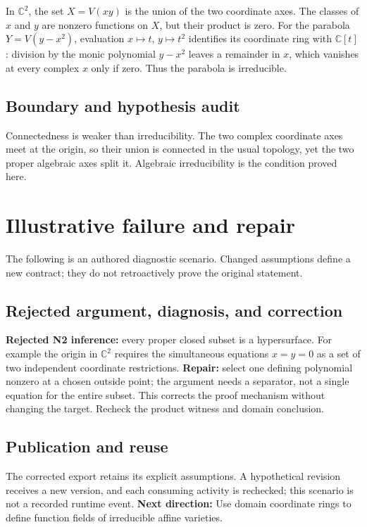 \documentclass[preprint,12pt,aps,pra,showkeys,amsmath,amssymb,superscriptaddress,floatfix]{revtex4-2}
\theoremstyle{definition}
\theoremstyle{remark}
\begin{document}
In \(\mathbb C^2\), the set \(X=V(xy)\) is the union of the two
coordinate axes. The classes of \(x\) and \(y\) are nonzero functions on
\(X\), but their product is zero. For the parabola \(Y=V(y-x^2)\),
evaluation \(x\mapsto t\), \(y\mapsto t^2\) identifies its coordinate
ring with \(\mathbb C[t]\): division by the monic polynomial \(y-x^2\)
leaves a remainder in \(x\), which vanishes at every complex \(x\) only
if zero. Thus the parabola is irreducible.

\subsection{Boundary and hypothesis audit}

Connectedness is weaker than irreducibility. The two complex coordinate
axes meet at the origin, so their union is connected in the usual
topology, yet the two proper algebraic axes split it. Algebraic
irreducibility is the condition proved here.

\section{Illustrative failure and repair}

The following is an authored diagnostic scenario. Changed assumptions
define a new contract; they do not retroactively prove the original
statement.

\subsection{Rejected argument, diagnosis, and correction}
\textbf{Rejected N2 inference:} every proper closed subset is a
hypersurface. For example the origin in \(\mathbb C^2\) requires the
simultaneous equations \(x=y=0\) as a set of two independent coordinate
restrictions. \textbf{Repair:} select one defining polynomial nonzero at
a chosen outside point; the argument needs a separator, not a single
equation for the entire subset. This corrects the proof mechanism
without changing the target. Recheck the product witness and domain
conclusion.

\subsection{Publication and reuse}
The corrected export retains its explicit assumptions. A hypothetical
revision receives a new version, and each consuming activity is
rechecked; this scenario is not a recorded runtime event. \textbf{Next
direction:} Use domain coordinate rings to define function fields of
irreducible affine varieties.
\end{document}
